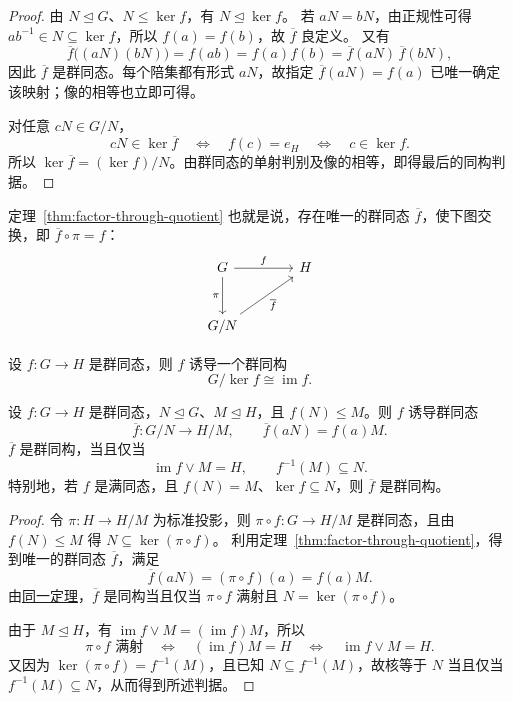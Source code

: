 \begin{proof}
由 $N\trianglelefteq G$、$N\leq\ker f$，有 $N\trianglelefteq\ker f$。
若 $aN=bN$，由正规性可得 $ab^{-1}\in N\subseteq\ker f$，所以 $f(a)=f(b)$，故 $\overline f$ 良定义。
又有
\[
  \overline f\bigl((aN)(bN)\bigr)=f(ab)=f(a)f(b)
  =\overline f(aN)\,\overline f(bN),
\]
因此 $\overline f$ 是群同态。每个陪集都有形式 $aN$，故指定 $\overline f(aN)=f(a)$ 已唯一确定该映射；像的相等也立即可得。

对任意 $cN\in G/N$，
\[
  cN\in\ker\overline f
  \quad\Longleftrightarrow\quad f(c)=e_H
  \quad\Longleftrightarrow\quad c\in\ker f.
\]
所以 $\ker\overline f=(\ker f)/N$。由群同态的单射判别及像的相等，即得最后的同构判据。
\end{proof}

\begin{purplenote}
定理~\ref{thm:factor-through-quotient} 也就是说，存在唯一的群同态 $\overline f$，使下图交换，即 $\overline f\circ\pi=f$：
\[
\begin{tikzcd}[row sep=large,column sep=large]
  G \arrow[r,"f"] \arrow[d,"\pi" swap] & H \\
  G/N \arrow[ur,"\overline f" swap] &
\end{tikzcd}
\]
\end{purplenote}

\begin{corollary}[第一同构定理]\label{cor:first-isomorphism}
设 $f:G\to H$ 是群同态，则 $f$ 诱导一个群同构
\[
  G/\ker f\cong\operatorname{im}f.
\]
\end{corollary}

\begin{corollary}\label{cor:induced-quotient-hom}
设 $f:G\to H$ 是群同态，$N\trianglelefteq G$、$M\trianglelefteq H$，且 $f(N)\leq M$。则 $f$ 诱导群同态
\[
  \overline f:G/N\longrightarrow H/M,
  \qquad \overline f(aN)=f(a)M.
\]
$\overline f$ 是群同构，当且仅当
\[
  \operatorname{im}f\vee M=H,
  \qquad f^{-1}(M)\subseteq N.
\]
特别地，若 $f$ 是满同态，且 $f(N)=M$、$\ker f\subseteq N$，则 $\overline f$ 是群同构。
\end{corollary}

\begin{proof}
令 $\pi:H\to H/M$ 为标准投影，则 $\pi\circ f:G\to H/M$ 是群同态，且由 $f(N)\leq M$ 得 $N\subseteq\ker(\pi\circ f)$。
利用定理~\ref{thm:factor-through-quotient}，得到唯一的群同态 $\overline f$，满足
\[
  \overline f(aN)=(\pi\circ f)(a)=f(a)M.
\]
由\hyperref[thm:factor-through-quotient]{同一定理}，$\overline f$ 是同构当且仅当 $\pi\circ f$ 满射且 $N=\ker(\pi\circ f)$。

由于 $M\trianglelefteq H$，有 $\operatorname{im}f\vee M=(\operatorname{im}f)M$，所以
\[
  \pi\circ f\text{ 满射}
  \quad\Longleftrightarrow\quad (\operatorname{im}f)M=H
  \quad\Longleftrightarrow\quad \operatorname{im}f\vee M=H.
\]
又因为 $\ker(\pi\circ f)=f^{-1}(M)$，且已知 $N\subseteq f^{-1}(M)$，故核等于 $N$ 当且仅当 $f^{-1}(M)\subseteq N$，从而得到所述判据。
\end{proof}

